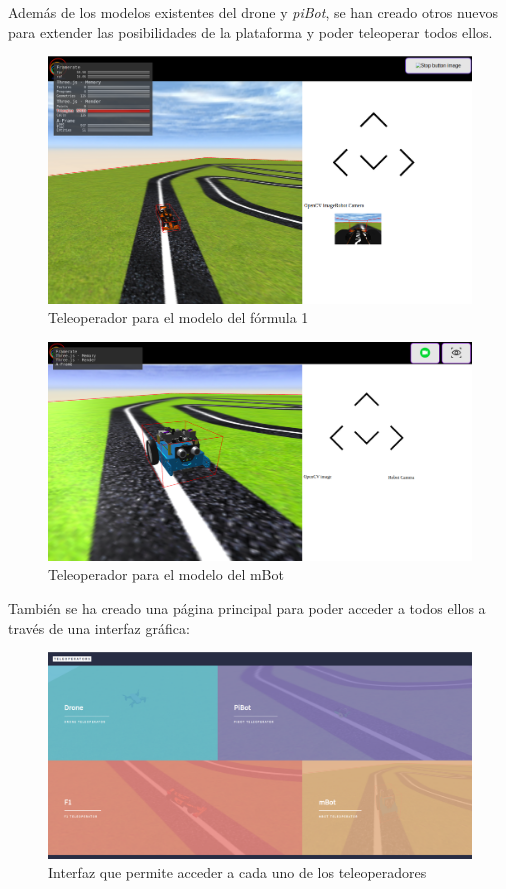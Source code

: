 Además de los modelos existentes del drone y \textit{piBot}, se han creado otros nuevos para extender las posibilidades de la plataforma y poder teleoperar todos ellos.
\begin{figure}[H]
    \centering            \includegraphics[scale=0.3]{img/f1_teleoperator.png}
    \caption{Teleoperador para el modelo del fórmula 1} \label{fig:f1_teleoperator}
\end{figure}

  \begin{figure}[H]
    \centering
    \includegraphics[scale=0.3]{img/mBot_teleoperator.png}
    \caption{Teleoperador para el modelo del mBot} \label{fig:mBot_teleoperator}
\end{figure}
    
También se ha creado una página principal para poder acceder a todos ellos a través de una interfaz gráfica: 

 \begin{figure}[H]
    \centering
    \includegraphics[scale=0.25]{img/teleoperators.png}
    \caption{Interfaz que permite acceder a cada uno de los teleoperadores} \label{fig:teleoperators}
\end{figure}

